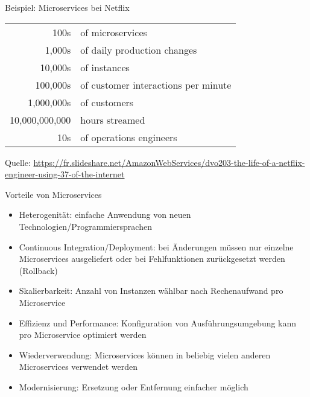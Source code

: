 \begin{frame}{Beispiel: Microservices bei Netflix}
	\large\bigskip\bigskip\bigskip\bigskip\bigskip
	\begin{center}
		\begin{tabular}{rl}
			100s & of microservices\\
			1,000s & of daily production changes\\
			10,000s & of instances\\
			100,000s & of customer interactions per minute\\
			1,000,000s & of customers\\
			10,000,000,000\phantom{s} & hours streamed\\
			10s & of operations engineers
		\end{tabular}
	\end{center}
	
	\bigskip\bigskip\bigskip\bigskip\hfill\tiny Quelle: \href{https://fr.slideshare.net/AmazonWebServices/dvo203-the-life-of-a-netflix-engineer-using-37-of-the-internet}{https://fr.slideshare.net/AmazonWebServices/dvo203-the-life-of-a-netflix-engineer-using-37-of-the-internet}
\end{frame}

\begin{frame}{Vorteile von Microservices}
	\begin{itemize}
		\item Heterogenität: einfache Anwendung von neuen Technologien/Programmiersprachen
		\item Continuous Integration/Deployment: bei Änderungen müssen nur einzelne Microservices ausgeliefert oder bei Fehlfunktionen zurückgesetzt werden (Rollback)
		\item Skalierbarkeit: Anzahl von Instanzen wählbar nach Rechenaufwand pro Microservice
		\pause
		\item Effizienz und Performance: Konfiguration von Ausführungsumgebung kann pro Microservice optimiert werden
		\item Wiederverwendung: Microservices können in beliebig vielen anderen Microservices verwendet werden
		\item Modernisierung: Ersetzung oder Entfernung einfacher möglich
	\end{itemize}
\end{frame}

